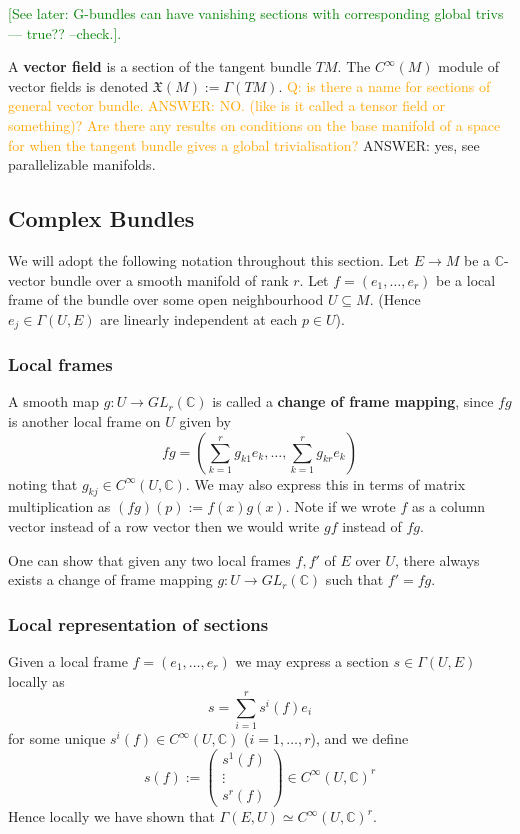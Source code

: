 \documentclass[a4paper]{article}
\theoremstyle{definition} \newtheorem*{definition}{Definition}
\theoremstyle{definition} \newtheorem*{definitions}{Definitions}
\theoremstyle{plain} \newtheorem{theorem}{Theorem}[section]
\theoremstyle{plain} \newtheorem{proposition}[theorem]{Proposition}
\theoremstyle{plain} \newtheorem{corollary}[theorem]{Corollary}
\theoremstyle{plain} \newtheorem{lemma}[theorem]{Lemma}
\theoremstyle{plain} \newtheorem{example}[theorem]{Example}
\newcommand{\question}[1]{\textcolor{orange}{#1}}
\newcommand{\finish}[1]{\textcolor{green}{#1}}
\newcommand{\defn}[1]{\textbf{#1}}
\newcommand{\complexnos}{\mathbb{C}}
\newcommand{\smoothCmaps}{C^\infty (U, \complexnos)}
\begin{document}
\finish{[See later: G-bundles can have vanishing sections with corresponding global trivs --- true?? --check.].}

A \defn{vector field} is a section of the tangent bundle $TM$. The $C^\infty (M)$ module of vector fields is denoted $\mathfrak{X}(M):=\Gamma(TM)$.
\question{Q: is there a name for sections of general vector bundle. ANSWER: NO. (like is it called a tensor field or something)?} \question{Are there any results on conditions on the base manifold of a space for when the tangent bundle gives a global trivialisation? } ANSWER: yes, see parallelizable manifolds.

\subsection{Complex Bundles}

We will adopt the following notation throughout this section. Let $E\to M$ be a $\complexnos$-vector bundle over a smooth manifold of rank $r$.
Let $f=(e_1,\ldots, e_r)$ be a local frame of the bundle over some open neighbourhood $U\subseteq M$. (Hence $e_j\in \Gamma(U, E)$ are linearly independent at each $p\in U$).

\subsubsection{Local frames}
A smooth map $g:U\to GL_r(\complexnos)$ is called a \defn{change of frame mapping}, since $fg$ is another local frame on $U$ given by 
$$fg=(\sum_{k=1}^r g_{k1}e_k,\ldots, \sum_{k=1}^r g_{kr}e_k)$$
noting that $g_{kj}\in \smoothCmaps$. We may also express this in terms of matrix multiplication as $(fg)(p):=f(x)g(x)$. Note if we wrote $f$ as a column vector instead of a row vector then we would write $gf$ instead of $fg$.

One can show that given any two local frames $f, f'$ of $E$ over $U$, there always exists a change of frame mapping $g:U\to GL_r(\complexnos)$ such that $f'=fg$. 

\subsubsection{Local representation of sections}
Given a local frame $f=(e_1,\ldots, e_r)$ we may express a section $s\in \Gamma(U, E)$ locally as
$$s=\sum_{i=1}^r s^i(f)e_i$$
for some unique $s^i(f)\in \smoothCmaps$ ($i=1,\ldots, r$), and we define 
$$s(f):= \begin{pmatrix}s^1(f) \\ \vdots \\ s^r(f)\end{pmatrix} \in \smoothCmaps^r$$
Hence locally we have shown that $\Gamma(E, U) \simeq \smoothCmaps^r$.
\end{document}
